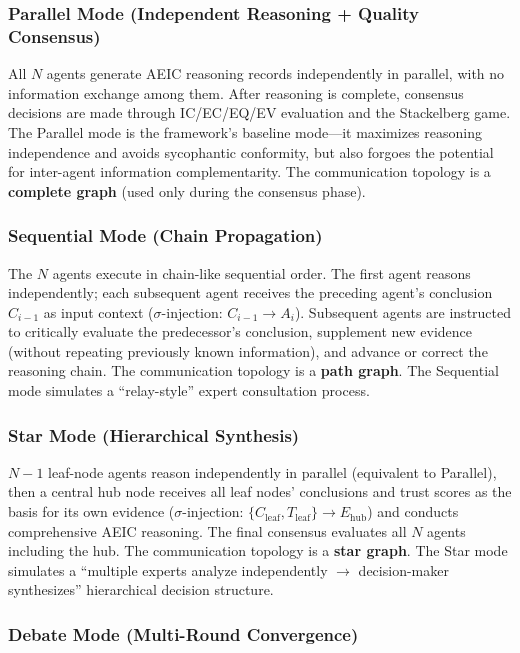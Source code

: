 \documentclass[12pt,a4paper]{article}
\begin{document}
\subsubsection{Parallel Mode (Independent Reasoning + Quality Consensus)}

All $N$ agents generate AEIC reasoning records independently in parallel, with no information exchange among them. After reasoning is complete, consensus decisions are made through IC/EC/EQ/EV evaluation and the Stackelberg game. The Parallel mode is the framework's baseline mode---it maximizes reasoning independence and avoids sycophantic conformity, but also forgoes the potential for inter-agent information complementarity. The communication topology is a \textbf{complete graph} (used only during the consensus phase).

\subsubsection{Sequential Mode (Chain Propagation)}

The $N$ agents execute in chain-like sequential order. The first agent reasons independently; each subsequent agent receives the preceding agent's conclusion $C_{i-1}$ as input context ($\sigma$-injection: $C_{i-1} \to A_i$). Subsequent agents are instructed to critically evaluate the predecessor's conclusion, supplement new evidence (without repeating previously known information), and advance or correct the reasoning chain. The communication topology is a \textbf{path graph}. The Sequential mode simulates a ``relay-style'' expert consultation process.

\subsubsection{Star Mode (Hierarchical Synthesis)}

$N-1$ leaf-node agents reason independently in parallel (equivalent to Parallel), then a central hub node receives all leaf nodes' conclusions and trust scores as the basis for its own evidence ($\sigma$-injection: $\{C_{\text{leaf}}, T_{\text{leaf}}\} \to E_{\text{hub}}$) and conducts comprehensive AEIC reasoning. The final consensus evaluates all $N$ agents including the hub. The communication topology is a \textbf{star graph}. The Star mode simulates a ``multiple experts analyze independently $\to$ decision-maker synthesizes'' hierarchical decision structure.

\subsubsection{Debate Mode (Multi-Round Convergence)}
\end{document}
